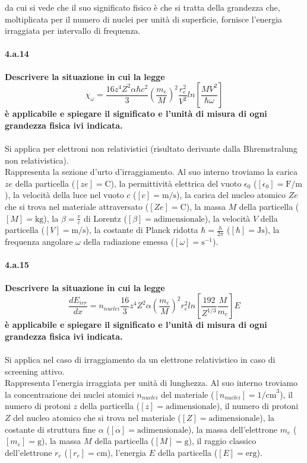 \documentclass[twoside]{article}
\begin{document}
da cui si vede che il suo significato fisico è che si tratta della grandezza che, moltiplicata per il numero di nuclei per unità di superficie, fornisce l'energia irraggiata per intervallo di frequenza.


\paragraph{4.a.14}\textbf{Descrivere la situazione in cui la legge
\begin{equation}
    \chi_{\omega}=\frac{16 z^4 Z^2 \alpha \hbar c^2}{3}\left( \frac{m_e}{M} \right)^2 \frac{r_e^2}{V^2}ln\left[ \frac{MV^2}{\hbar \omega} \right]
\end{equation}
è applicabile
e spiegare il significato e l'unità di misura di ogni grandezza fisica ivi indicata.
}\\ \\%
Si applica per elettroni non relativistici (risultato derivante dalla Bhremstralung non relativistica).
\\
Rappresenta la sezione d'urto d'irraggiamento. Al suo interno troviamo la carica $ze$ della particella ($[ze]=\text{C}$), la permittività elettrica del vuoto $\epsilon_0$ ($[\epsilon_0]=\text{F/m}$), la velocità della luce nel vuoto $c$ ($[c]=\text{m/s}$), la carica del nucleo atomico $Ze$ che si trova nel materiale attraversato ($[Ze]=\text{C}$), la massa $M$ della particella ($[M]=\text{kg}$), la $\beta=\frac{v}{c}$ di Lorentz ($[\beta]=\text{adimensionale}$), la velocità $V$ della particella ($[V]=\text{m/s}$), la costante di Planck ridotta $\hbar=\frac{h}{2\pi}$ ($[\hbar]=\text{Js}$), la frequenza angolare $\omega$ della radiazione emessa ($[\omega]=\text{s}^{-1}$).

\paragraph{4.a.15}\textbf{Descrivere la situazione in cui la legge 
\begin{equation}
    \frac{dE_{irr}}{dx}=n_{nuclei}\frac{16}{3}z^4Z^2\alpha \left( \frac{m_e}{M} \right)^2 r_e^2 ln\left[ \frac{192}{Z^{1/3}}\frac{M}{m_e} \right]E
\end{equation}
è
applicabile e spiegare il significato e l'unità di misura di ogni grandezza fisica ivi
indicata.
}\\ \\
Si applica nel caso di irraggiamento da un elettrone relativistico in caso di screening attivo.\\
Rappresenta l'energia irraggiata per unità di lunghezza. Al suo interno troviamo la concentrazione dei nuclei atomici $n_{nuclei}$ del materiale ($[n_{nuclei}]=\text{1/cm}^3$), il numero di protoni $z$ della particella ($[z]=\text{adimensionale}$), il numero di protoni $Z$ del nucleo atomico che si trova nel materiale ($[Z]=\text{adimensionale}$), la costante di struttura fine $\alpha$ ($[\alpha]=\text{adimensionale}$), la massa dell'elettrone $m_e$ ($[m_e]=\text{g}$), la massa $M$ della particella ($[M]=\text{g}$), il raggio classico dell'elettrone $r_e$ ($[r_e]=\text{cm}$), l'energia $E$ della particella ($[E]=\text{erg}$).
\end{document}
